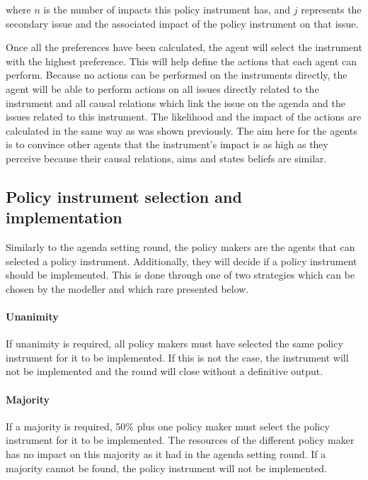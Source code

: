 where $n$ is the number of impacts this policy instrument has, and $j$ represents the secondary issue and the associated impact of the policy instrument on that issue.

Once all the preferences have been calculated, the agent will select the instrument with the highest preference. This will help define the actions that each agent can perform. Because no actions can be performed on the instruments directly, the agent will be able to perform actions on all issues directly related to the instrument and all causal relations which link the issue on the agenda and the issues related to this instrument. The likelihood and the impact of the actions are calculated in the same way as was shown previously. The aim here for the agents is to convince other agents that the instrument’s impact is as high as they perceive because their causal relations, aims and states beliefs are similar.

\subsection{Policy instrument selection and implementation}

Similarly to the agenda setting round, the policy makers are the agents that can selected a policy instrument. Additionally, they will decide if a policy instrument should be implemented. This is done through one of two strategies which can be chosen by the modeller and which rare presented below.

\paragraph{Unanimity}

If unanimity is required, all policy makers must have selected the same policy instrument for it to be implemented. If this is not the case, the instrument will not be implemented and the round will close without a definitive output.

\paragraph{Majority}

If a majority is required, 50\% plus one policy maker must select the policy instrument for it to be implemented. The resources of the different policy maker has no impact on this majority as it had in the agenda setting round. If a majority cannot be found, the policy instrument will not be implemented.

